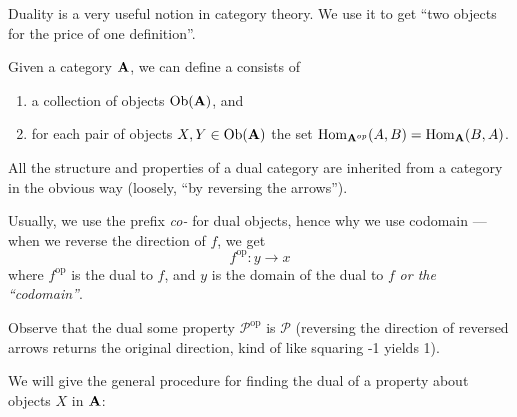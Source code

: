 Duality is a very useful notion in category theory. We use it to
get ``two objects for the price of one definition''. 

\begin{defn}%
Given a category $\mathbf{A}$, we can define a 
consists of
\begin{enumerate}
\item a collection of objects $\operatorname{Ob}(\mathbf{A})$, and
\item for each pair of objects $X,Y\in\operatorname{Ob}(\mathbf{A})$ the set
  $\operatorname{Hom}_{\mathbf{A}^{op}}(A,B)=\operatorname{Hom}_{\mathbf{A}}(B,A)$.
\end{enumerate}
All the structure and properties of a dual category are inherited
from a category in the obvious way (loosely, ``by reversing the arrows'').
\end{defn}

\noindent Usually, we use the prefix \emph{co-} for dual objects, hence why
we use codomain --- when we reverse the direction of $f$, we get
\begin{equation}%
f^{\text{op}}:y\to x
\end{equation}
where $f^{\text{op}}$ is the dual to $f$, and $y$ is the domain
of the dual to $f$ \emph{or the ``codomain''}.


\begin{rmk}
Observe that the dual some property $\mathcal{P}^{\text{op}}$ is
$\mathcal{P}$ (reversing the direction of reversed arrows returns
the original direction, kind of like squaring -1 yields 1).
\end{rmk}

We will give the general procedure for finding the dual of a
property about objects $X$ in $\mathbf{A}$:


